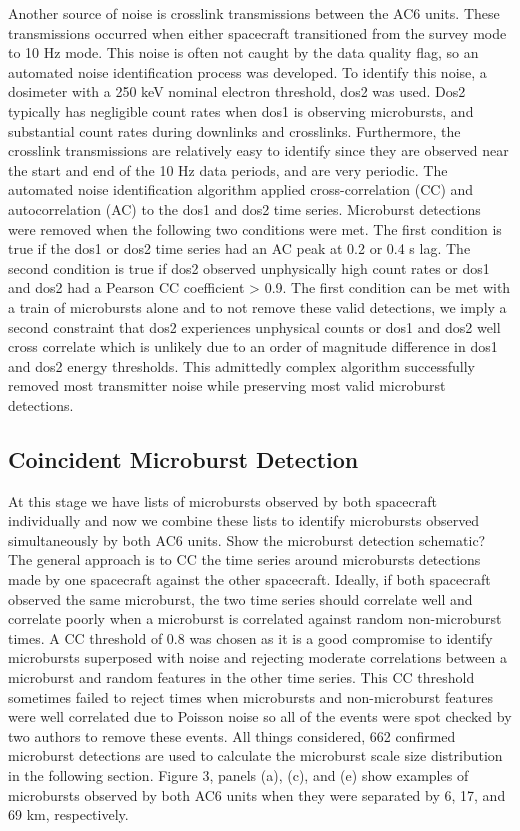 \documentclass[draft]{agujournal2019}
\begin{document}
Another source of noise is crosslink transmissions between the AC6 units. These transmissions occurred when either spacecraft transitioned from the survey mode to 10 Hz mode. This noise is often not caught by the data quality flag, so an automated noise identification process was developed. To identify this noise, a dosimeter with a 250 keV nominal electron threshold, dos2 was used. Dos2 typically has negligible count rates when dos1 is observing microbursts, and substantial count rates during downlinks and crosslinks. Furthermore, the crosslink transmissions are relatively easy to identify since they are observed near the start and end of the 10 Hz data periods, and are very periodic. The automated noise identification algorithm applied cross-correlation (CC) and autocorrelation (AC) to the dos1 and dos2 time series. Microburst detections were removed when the following two conditions were met. The first condition is true if the dos1 or dos2 time series had an AC peak at 0.2 or 0.4 s lag. The second condition is true if dos2 observed unphysically high count rates or dos1 and dos2 had a Pearson CC coefficient > 0.9. The first condition can be met with a train of microbursts alone and to not remove these valid detections, we imply a second constraint that dos2 experiences unphysical counts or dos1 and dos2 well cross correlate which is unlikely due to an order of magnitude difference in dos1 and dos2 energy thresholds. This admittedly complex algorithm successfully removed most transmitter noise while preserving most valid microburst detections.

\subsection{Coincident Microburst Detection}
At this stage we have lists of microbursts observed by both spacecraft individually and now we combine these lists to identify microbursts observed simultaneously by both AC6 units. Show the microburst detection schematic? The general approach is to CC the time series around microbursts detections made by one spacecraft against the other spacecraft. Ideally, if both spacecraft observed the same microburst, the two time series should correlate well and correlate poorly when a microburst is correlated against random non-microburst times. A CC threshold of 0.8 was chosen as it is a good compromise to identify microbursts superposed with noise and rejecting moderate correlations between a microburst and random features in the other time series. This CC threshold sometimes failed to reject times when microbursts and non-microburst features were well correlated due to Poisson noise so all of the events were spot checked by two authors to remove these events. All things considered, 662 confirmed microburst detections are used to calculate the microburst scale size distribution in the following section. Figure 3, panels (a), (c), and (e) show examples of microbursts observed by both AC6 units when they were separated by 6, 17, and 69 km, respectively.
\end{document}
